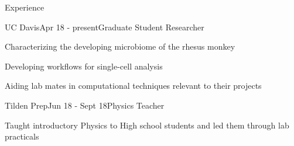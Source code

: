 \documentclass{resume} %
\begin{document}
\begin{rSection}{Experience}
\begin{rSubsection}{UC Davis}{Apr 18 - present}{Graduate Student Researcher}{}

\item Characterizing the developing microbiome of the rhesus monkey 
\item Developing workflows for single-cell analysis
\item Aiding lab mates in computational techniques relevant to their projects

\end{rSubsection}


\begin{rSubsection}{Tilden Prep}{Jun 18 - Sept 18}{Physics Teacher}{}

\item Taught introductory Physics to High school students and led them through lab practicals

\end{rSubsection}
\end{rSection}


%
%
\end{document}
